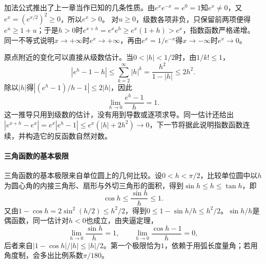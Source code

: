 加法公式推出了上一章当作已知的几条性质。由$e^xe^{-x}=e^0=1$知$e^x\neq0$，又$e^x=(e^{x/2})^2\geq0$，所以$e^x>0$。
对$u\geq0$，级数各项非负，只保留前两项便得$e^u\geq1+u$；于是$h>0$时$e^{x+h}=e^xe^h\geq e^x(1+h)>e^x$，指数函数严格递增。
同一不等式说明$x\to+\infty$时$e^x\to+\infty$，再由$e^x=1/e^{-x}$得$x\to-\infty$时$e^x\to0$。

原点附近的变化可以直接从级数估计。当$0<|h|<1/2$时，由$1/k!\leq1$，
\[
 |e^h-1-h|\leq\sum_{k=2}^\infty|h|^k=\frac{h^2}{1-|h|}\leq2h^2.
\]
除以$|h|$得$|(e^h-1)/h-1|\leq2|h|$，因此
\[
 \lim_{h\to0}\frac{e^h-1}{h}=1.
\]
这一推导只用到级数的估计，没有用到导数或逐项求导。同一估计还给出$|e^{x+h}-e^x|=e^x|e^h-1|\leq e^x(|h|+2h^2)\to0$，下一节将据此说明指数函数连续，并构造它的反函数自然对数。

\paragraph{三角函数的基本极限}
三角函数的基本极限来自单位圆上的几何比较。设$0<h<\pi/2$，比较单位圆中以$h$为圆心角的内接三角形、扇形与外切三角形的面积，得到$\sin h\leq h\leq\tan h$，即
\[
 \cos h\leq\frac{\sin h}h\leq1.
\]
又由$1-\cos h=2\sin^2(h/2)\leq h^2/2$，得到$0\leq1-\sin h/h\leq h^2/2$。$\sin h/h$是偶函数，同一估计对$h<0$也成立，由夹逼定理，
\[
 \lim_{h\to0}\frac{\sin h}h=1,\qquad\lim_{h\to0}\frac{\cos h-1}h=0,
\]
后者来自$|1-\cos h|/|h|\leq|h|/2$。第一个极限恰为$1$，依赖于用弧长度量角；若用角度制，会多出比例系数$\pi/180$。
